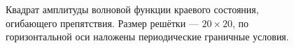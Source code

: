 \documentclass{article}
\begin{document}
    \begin{figure}[h]
        \centering
        \begin{minipage}[h]{0.4\linewidth}
        \end{minipage}
        \hfill
        \begin{minipage}[h]{0.4\linewidth}
        \end{minipage}
        \caption{
            Квадрат амплитуды волновой функции краевого состояния, огибающего препятствия. 
            Размер решётки --- $20\times20$, по горизонтальной оси наложены периодические
            граничные условия.
        }
    \end{figure}
\end{document}
